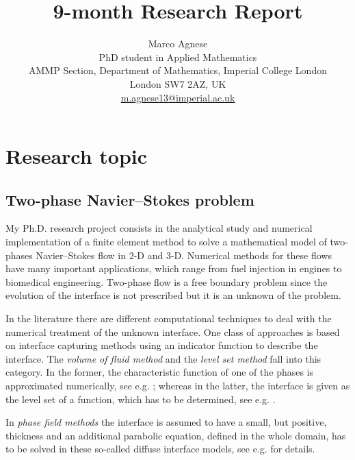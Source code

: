 \documentclass[a4paper,11pt, onecolumn]{article}
\newcommand{\cor}[1]{\textit{#1}} %
\begin{document}
\title{9-month Research Report}
\author{
Marco Agnese \\ 
PhD student in Applied Mathematics \\
AMMP Section, Department of Mathematics, Imperial College London \\
London SW7 2AZ, UK \\
\url{m.agnese13@imperial.ac.uk}
}
\date{}
\maketitle

\section{Research topic}

\subsection{Two-phase Navier--Stokes problem}

My Ph.D. research project consists in the analytical study and numerical implementation of a finite element method to solve a mathematical model of two-phases Navier--Stokes flow in 2-D and 3-D. Numerical methods for these flows have many important applications, which range from fuel injection in engines to biomedical engineering. Two-phase flow is a free boundary problem since the evolution of the interface is not prescribed but it is an unknown of the problem.
\newline

\noindent In the literature there are different computational techniques to deal with the numerical treatment of the unknown interface. One class of approaches is based on interface capturing methods using an indicator function to describe the interface. The \cor{volume of fluid method} and the \cor{level set method} fall into this category. In the former, the characteristic function of one of the phases is approximated numerically, see e.g. \cite{HirtN81,RenardyR02,Popinet09}; whereas in the latter, the interface is given as the level set of a function, which has to be determined, see e.g. \cite{GrossR07}. 

\noindent In \cor{phase field methods} the interface is assumed to have a small, but positive, thickness and an additional parabolic equation, defined in the whole domain, has to be solved in these so-called diffuse interface models, see e.g. \cite{HohenbergH77,AndersonMW98,LowengrubT98,Feng06,KaySW08,AbelsGG12} for details.
\end{document}
